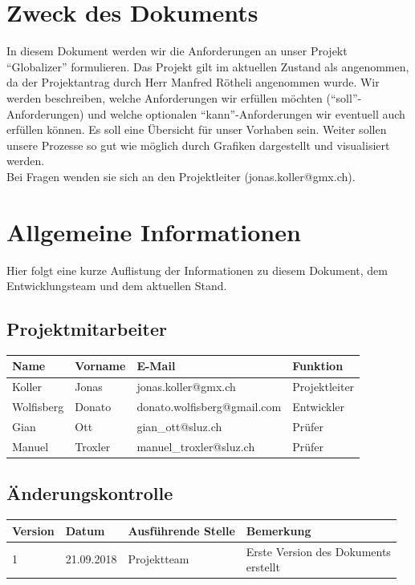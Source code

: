 \documentclass[12pt]{article}
\begin{document}
  \section{Zweck des Dokuments}
    In diesem Dokument werden wir die Anforderungen an unser Projekt “Globalizer” formulieren. Das Projekt gilt im aktuellen Zustand als angenommen, da der Projektantrag durch Herr Manfred Rötheli angenommen wurde. Wir werden beschreiben, welche Anforderungen wir erfüllen möchten (“soll”-Anforderungen) und welche optionalen “kann”-Anforderungen wir eventuell auch erfüllen können. Es soll eine Übersicht für unser Vorhaben sein. Weiter sollen unsere Prozesse so gut wie möglich durch Grafiken dargestellt und visualisiert werden. \\
    Bei Fragen wenden sie sich an den Projektleiter (jonas.koller@gmx.ch).

  \section{Allgemeine Informationen}
    Hier folgt eine kurze Auflistung der Informationen zu diesem Dokument, dem Entwicklungsteam und dem aktuellen Stand.

  \subsection{Projektmitarbeiter}
    \begin{table}[h]
      \begin{tabularx}{\textwidth}{|l|l|X|l|}
        \hline
        \textbf{Name} & \textbf{Vorname}  & \textbf{E-Mail}                & \textbf{Funktion}     \\ \hline
        Koller        & Jonas             & jonas.koller@gmx.ch            & Projektleiter         \\ \hline
        Wolfisberg    & Donato            & donato.wolfisberg@gmail.com    & Entwickler            \\ \hline
        Gian          & Ott               & gian\_ott@sluz.ch              & Prüfer                \\ \hline
        Manuel        & Troxler           & manuel\_troxler@sluz.ch        & Prüfer                \\ \hline
      \end{tabularx}%
    \end{table}

  \subsection{Änderungskontrolle}
    \begin{table}[h]
      \begin{tabularx}{\textwidth}{|l|l|l|X|}
        \hline
        \textbf{Version} & \textbf{Datum} & \textbf{Ausführende Stelle} & \textbf{Bemerkung}                     \\ \hline
        1                & 21.09.2018     & Projektteam                 & \makecell[l]{Erste Version des Dokuments \\ erstellt}  \\ \hline
      \end{tabularx}
    \end{table}
\end{document}
